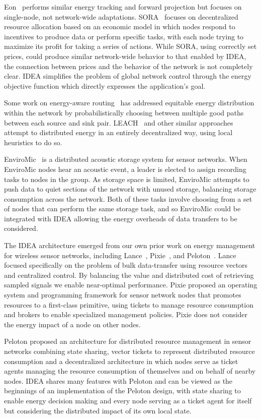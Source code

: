 Eon~\cite{eon-sensys07} performs similar energy tracking and forward
projection but focuses on single-node, not network-wide adaptations.
SORA~\cite{sora-nsdi05} focuses on decentralized resource allocation based on
an economic model in which nodes respond to incentives to produce data or
perform specific tasks, with each node trying to maximize its profit for
taking a series of actions. While SORA, using correctly set prices, could
produce similar network-wide behavior to that enabled by IDEA, the connection
between prices and the behavior of the network is not completely clear. IDEA
simplifies the problem of global network control through the energy objective
function which directly expresses the application's goal.

Some work on energy-aware routing~\cite{ShahRabaey2002,381685} has addressed
equitable energy distribution within the network by probabilistically
choosing between multiple good paths between each source and sink pair.
LEACH~\cite{leach} and other similar approaches attempt to distributed energy
in an entirely decentralized way, using local heuristics to do so.

EnviroMic~\cite{enviromic} is a distributed acoustic storage system for
sensor networks.  When EnviroMic nodes hear an acoustic event, a leader is
elected to assign recording tasks to nodes in the group.  As storage space is
limited, EnviroMic attempts to push data to quiet sections of the network
with unused storage, balancing storage consumption across the network. Both
of these tasks involve choosing from a set of nodes that can perform the same
storage task, and so EnviroMic could be integrated with IDEA allowing the
energy overheads of data transfers to be considered.

The IDEA architecture emerged from our own prior work on energy management
for wireless sensor networks, including Lance~\cite{lance-sensys08},
Pixie~\cite{pixie-sensys08}, and Peloton~\cite{peloton-hotos09}. Lance
focused specifically on the problem of bulk data-transfer using resource
vectors and centralized control. By balancing the value and distributed
cost of retrieving sampled signals we enable near-optimal performance.
Pixie proposed an operating system and programming framework for sensor
network nodes that promotes resources to a first-class primitive, using
tickets to manage resource consumption and brokers to enable specialized
management policies. Pixie does not consider the energy impact of a node on
other nodes.

Peloton proposed an architecture for distributed resource management in
sensor networks combining state sharing, vector tickets to represent
distributed resource consumption and a decentralized architecture in which
nodes serve as ticket agents managing the resource consumption of themselves
and on behalf of nearby nodes. IDEA shares many features with Peloton and can
be viewed as the beginnings of an implementation of the Peloton design, with
state sharing to enable energy decision making and every node serving as a
ticket agent for itself but considering the distributed impact of its own
local state.
